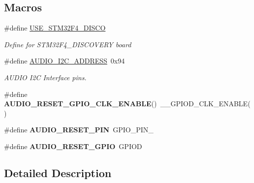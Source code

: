 \subsection*{Macros}
\begin{DoxyCompactItemize}
\item 
\mbox{\label{group___s_t_m32_f4___d_i_s_c_o_v_e_r_y___l_o_w___l_e_v_e_l___exported___constants_ga1e08cb6c61fea1bc6913462131d50537}} 
\#define \mbox{\hyperlink{group___s_t_m32_f4___d_i_s_c_o_v_e_r_y___l_o_w___l_e_v_e_l___exported___constants_ga1e08cb6c61fea1bc6913462131d50537}{U\+S\+E\+\_\+\+S\+T\+M32\+F4\+\_\+\+D\+I\+S\+CO}}
\begin{DoxyCompactList}\small\item\em Define for S\+T\+M32\+F4\+\_\+\+D\+I\+S\+C\+O\+V\+E\+RY board ~\newline
 \end{DoxyCompactList}\item 
\mbox{\label{group___s_t_m32_f4___d_i_s_c_o_v_e_r_y___l_o_w___l_e_v_e_l___exported___constants_gade41f38ee3d3bd0b5c0c0d4b48ace840}} 
\#define \mbox{\hyperlink{group___s_t_m32_f4___d_i_s_c_o_v_e_r_y___l_o_w___l_e_v_e_l___exported___constants_gade41f38ee3d3bd0b5c0c0d4b48ace840}{A\+U\+D\+I\+O\+\_\+\+I2\+C\+\_\+\+A\+D\+D\+R\+E\+SS}}~0x94
\begin{DoxyCompactList}\small\item\em A\+U\+D\+IO I2C Interface pins. \end{DoxyCompactList}\item 
\mbox{\label{group___s_t_m32_f4___d_i_s_c_o_v_e_r_y___l_o_w___l_e_v_e_l___exported___constants_gacd5d50c72f3f141901abec217b6236cd}} 
\#define {\bfseries A\+U\+D\+I\+O\+\_\+\+R\+E\+S\+E\+T\+\_\+\+G\+P\+I\+O\+\_\+\+C\+L\+K\+\_\+\+E\+N\+A\+B\+LE}()~\+\_\+\+\_\+\+G\+P\+I\+O\+D\+\_\+\+C\+L\+K\+\_\+\+E\+N\+A\+B\+LE()
\item 
\mbox{\label{group___s_t_m32_f4___d_i_s_c_o_v_e_r_y___l_o_w___l_e_v_e_l___exported___constants_ga4d60ca2a691caa4cd02d48916ef8edf2}} 
\#define {\bfseries A\+U\+D\+I\+O\+\_\+\+R\+E\+S\+E\+T\+\_\+\+P\+IN}~G\+P\+I\+O\+\_\+\+P\+I\+N\+\_
\item 
\mbox{\label{group___s_t_m32_f4___d_i_s_c_o_v_e_r_y___l_o_w___l_e_v_e_l___exported___constants_ga9e14d8b79acddb3613832e236b5c205f}} 
\#define {\bfseries A\+U\+D\+I\+O\+\_\+\+R\+E\+S\+E\+T\+\_\+\+G\+P\+IO}~G\+P\+I\+OD
\end{DoxyCompactItemize}


\subsection{Detailed Description}
